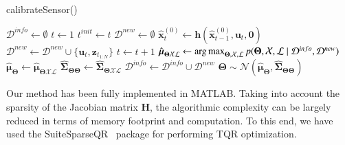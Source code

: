 \begin{algorithm}[ht]
\caption{calibrateSensor()}
\label{alg:calibration}
{}
\vskip 0.2cm
$\mathcal{D}^{info}\leftarrow\emptyset$ \;
$t\leftarrow1$ \;
 {
   \;
  $t^{init} \leftarrow t$ \;
  $\mathcal{D}^{new}\leftarrow\emptyset$ \;
   {
    $\hat{\mathbf{x}}_t^{(0)} \leftarrow
      \mathbf{h}(\hat{\mathbf{x}}_{t-1}^{(0)},\mathbf{u}_t,\mathbf{0})$ \;
    $\mathcal{D}^{new}\leftarrow\mathcal{D}^{new}\cup\{\mathbf{u}_t,
      \mathbf{z}_{t_{1:N}}\}$ \;
    $t \leftarrow t + 1$ \;
  }
   \;
  $\hat{\boldsymbol{\mu}}_{\boldsymbol{\Theta}\mathcal{X}\mathcal{L}} \leftarrow
    \operatorname*{arg\,max}_{\boldsymbol{\Theta},\mathcal{X},\mathcal{L}}
    p(\boldsymbol{\Theta}, \mathcal{X},\mathcal{L} \mid\mathcal{D}^{info},
    \mathcal{D}^{new})$ \;
   \;
  $\hat{\boldsymbol{\mu}}_{\boldsymbol{\Theta}}\leftarrow
    \hat{\boldsymbol{\mu}}_{\boldsymbol{\Theta}\mathcal{X}\mathcal{L}}$ \;
  $\hat{\boldsymbol{\Sigma}}_{\boldsymbol{\Theta}\boldsymbol{\Theta}}\leftarrow
    \hat{\boldsymbol{\Sigma}}_{\boldsymbol{\Theta}\mathcal{X}\mathcal{L}}$ \;
   \;
   {
    $\mathcal{D}^{info}\leftarrow\mathcal{D}^{info}\cup\mathcal{D}^{new}$ \;
    $\boldsymbol{\Theta}\sim\mathcal{N}(
      \hat{\boldsymbol{\mu}}_{\boldsymbol{\Theta}},
      \hat{\boldsymbol{\Sigma}}_{\boldsymbol{\Theta}\boldsymbol{\Theta}})$ \;
  }
}
\end{algorithm}

Our method has been fully implemented in MATLAB. Taking into account the
sparsity of the Jacobian matrix $\mathbf{H}$, the algorithmic complexity can
be largely reduced in terms of memory footprint and computation. To this end, we
have used the SuiteSparseQR~\cite{davis11algorithm} package for performing
TQR optimization.
